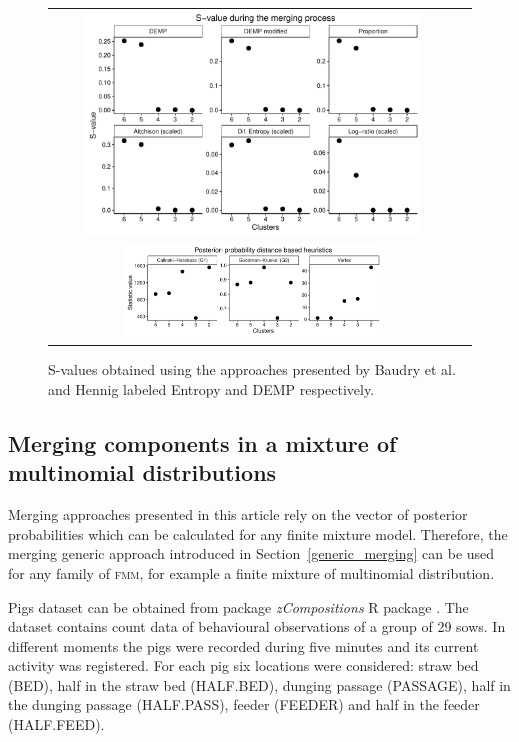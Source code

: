 \documentclass[submit]{smj}
\theoremstyle{definition}
\newcommand{\fmm}{\textsc{fmm}\xspace}
\begin{document}
\begin{figure}[t]
\begin{center}
\begin{tabular}{cc}
  \includegraphics[width=0.85\textwidth]{figures/gaussian_Svalues.pdf} \\
   \includegraphics[width=0.65\textwidth]{figures/gaussian_statistics.pdf}
 \end{tabular}
 \caption{S-values obtained using the approaches presented by Baudry et al. and Hennig labeled Entropy and DEMP respectively.}\label{gaussian_Svalues}
\end{center}
\end{figure}

\subsection{Merging components in a mixture of multinomial distributions}\label{multinom_example}

Merging approaches presented in this article rely on the vector of posterior probabilities which can be calculated for any finite mixture model. Therefore, the merging generic approach introduced in Section~\ref{generic_merging} can be used for any family of \fmm, for example a finite mixture of multinomial distribution.

Pigs dataset can be obtained from package \emph{zCompositions} R package \citep{palarea2015zcompositions}. The dataset contains count data of behavioural observations of a group of 29 sows. In different moments the pigs were recorded during five minutes and its current activity was registered. For each pig six locations were considered: straw bed (BED), half in the straw bed (HALF.BED), dunging passage (PASSAGE), half in the dunging passage (HALF.PASS), feeder (FEEDER) and half in the feeder (HALF.FEED).
\end{document}
